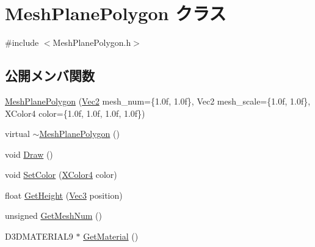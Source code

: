 \hypertarget{class_mesh_plane_polygon}{}\section{Mesh\+Plane\+Polygon クラス}
\label{class_mesh_plane_polygon}


{\ttfamily \#include $<$Mesh\+Plane\+Polygon.\+h$>$}

\subsection*{公開メンバ関数}
\begin{DoxyCompactItemize}
\item 
\mbox{\hyperlink{class_mesh_plane_polygon_a7db07104974799895b42997c71ba8d3e}{Mesh\+Plane\+Polygon}} (\mbox{\hyperlink{_vector3_d_8h_a5ef6e95dfc5f9d3820b71772d99bbc25}{Vec2}} mesh\+\_\+num=\{1.\+0f, 1.\+0f\}, Vec2 mesh\+\_\+scale=\{1.\+0f, 1.\+0f\}, X\+Color4 color=\{1.\+0f, 1.\+0f, 1.\+0f, 1.\+0f\})
\item 
virtual \mbox{\hyperlink{class_mesh_plane_polygon_a6c76a24c3f35cd9a77e6947c22fa4c3d}{$\sim$\+Mesh\+Plane\+Polygon}} ()
\item 
void \mbox{\hyperlink{class_mesh_plane_polygon_a813d5d6897ec0ce2b672cd6e1360e281}{Draw}} ()
\item 
void \mbox{\hyperlink{class_mesh_plane_polygon_a514e1738386a6a4be0d37ea38bd425f2}{Set\+Color}} (\mbox{\hyperlink{_vector3_d_8h_a680c30c4a07d86fe763c7e01169cd6cc}{X\+Color4}} color)
\item 
float \mbox{\hyperlink{class_mesh_plane_polygon_ac04d763b16a962f00c99e3354e45f320}{Get\+Height}} (\mbox{\hyperlink{_vector3_d_8h_ab16f59e4393f29a01ec8b9bbbabbe65d}{Vec3}} position)
\item 
unsigned \mbox{\hyperlink{class_mesh_plane_polygon_a42d1d92dea7878cf59d418aa7ab5106d}{Get\+Mesh\+Num}} ()
\item 
D3\+D\+M\+A\+T\+E\+R\+I\+A\+L9 $\ast$ \mbox{\hyperlink{class_mesh_plane_polygon_a1188cf0072e000227ecce6210ba2778c}{Get\+Material}} ()
\end{DoxyCompactItemize}
